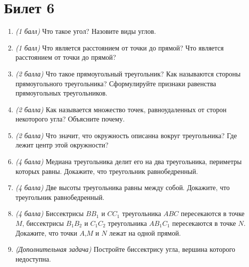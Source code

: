 \documentclass[12pt, a4paper]{article}
\begin{document}
\section*{Билет 6}
\begin{enumerate}
\item \textit{(1 балл)} Что такое угол? Назовите виды углов.
\item \textit{(1 балл)} Что является расстоянием от точки до прямой? Что является расстоянием от точки до прямой?
\item \textit{(2 балла)} Что такое прямоугольный треугольник? Как называются стороны прямоугольного треугольника? Сформулируйте признаки равенства прямоугольных треугольников.
\item \textit{(2 балла)} Как называется множество точек, равноудаленных от сторон некоторого угла? Объясните почему.
\item \textit{(2 балла)} Что значит, что окружность описанна вокруг треугольника? Где лежит центр этой окружности?
\item \textit{(4 балла)} Медиана треугольника делит его на два треугольника, периметры которых равны. Докажите, что треугольник равнобедренный.
\item \textit{(4 балла)} Две высоты треугольника равны между собой. Докажите, что треугольник равнобедренный.
\item \textit{(4 балла)} Биссектрисы $BB_1$ и $CC_1$ треугольника $ABC$ пересекаются в точке $M$, биссектрисы $B_1B_2$ и $C_1C_2$ треугольника $AB_1C_1$
пересекаются в точке $N$. Докажите, что точки $A$,$M$ и $N$ лежат на одной прямой.
\item \textit{(Дополнительная задача)} Постройте биссектрису угла, вершина которого недоступна.
\end{enumerate}
\end{document}
